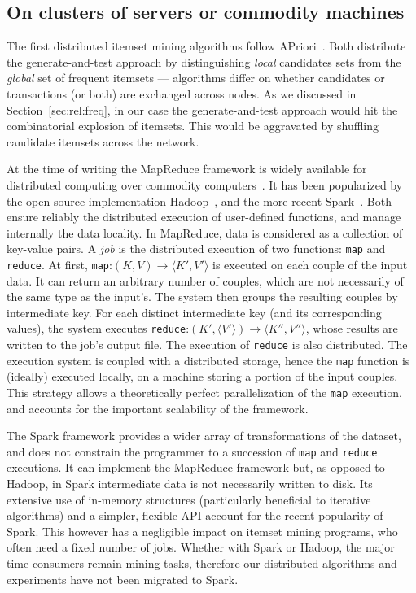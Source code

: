 \subsection{On clusters of servers or commodity machines}

The first distributed itemset mining algorithms follow APriori~\cite{CheungPDIS96,AgrawalTKDE96}.
Both distribute the generate-and-test approach
by distinguishing {\em local} candidates sets from
the {\em global} set of frequent itemsets ---
algorithms differ on whether candidates or transactions (or both) are exchanged across nodes.
As we discussed in Section~\ref{sec:rel:freq},
in our case the generate-and-test approach would hit the combinatorial explosion of itemsets.
This would be aggravated by shuffling candidate itemsets across the network.

At the time of writing
the MapReduce framework is widely available for distributed computing over commodity computers~\cite{DeanOSDI04}.
It has been popularized by the open-source implementation Hadoop~\cite{hadoop},
and the more recent Spark~\cite{ZahariaHC10}.
Both ensure reliably the distributed execution of user-defined functions,
and manage internally the data locality.
In MapReduce, data is considered as a collection of key-value pairs.
A {\em job} is the distributed execution of two functions: \verb|map| and \verb|reduce|.
At first,
\verb|map|:$(K,V)\rightarrow \langle K',V' \rangle$
is executed on each couple of the input data.
It can return an arbitrary number of couples,
which are not necessarily of the same type as the input's.
The system then groups the resulting couples by intermediate key.
For each distinct intermediate key (and its corresponding values), the system executes
\verb|reduce|:$(K', \langle V' \rangle) \rightarrow \langle K'',V'' \rangle$,
whose results are written to the job's output file.
The execution of \verb|reduce| is also distributed.
The execution system is coupled with a distributed storage,
hence the \verb|map| function is (ideally) executed locally,
on a machine storing a portion of the input couples.
This strategy allows a theoretically perfect parallelization of the \verb|map| execution,
and accounts for the important scalability of the framework.

The Spark framework provides a wider array of transformations of the dataset,
and does not constrain the programmer to a succession of \verb|map| and \verb|reduce| executions.
It can implement the MapReduce framework
but, as opposed to Hadoop, in Spark intermediate data is not necessarily written to disk.
Its extensive use of in-memory structures (particularly beneficial to iterative algorithms)
and a simpler, flexible API account for the recent popularity of Spark.
This however has a negligible impact on itemset mining programs,
who often need a fixed number of jobs.
Whether with Spark or Hadoop, the major time-consumers remain mining tasks,
therefore our distributed algorithms and experiments have not been migrated to Spark.

